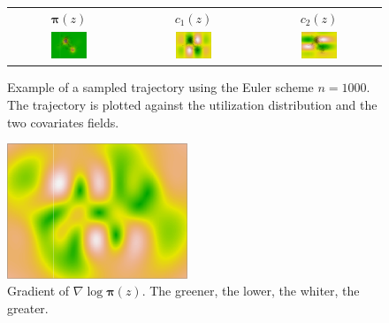 \documentclass[10pt,a4paper]{article}
\newcommand{\ud}{\boldsymbol{\pi}}
\begin{document}
\begin{figure}
\centering
\begin{tabular}{ccc}
$\ud(z)$&$c_1(z)$&$c_2(z)$\\
\includegraphics[width = 0.32\textwidth]{figures/TrajPlusUD}&
\includegraphics[width = 0.32\textwidth]{figures/TrajPlusC1}&
\includegraphics[width = 0.32\textwidth]{figures/TrajPlusC2}
\end{tabular}
\caption{\label{fig:ExampleTrajectory} Example of a sampled trajectory using the Euler scheme $n = 1000$. The trajectory is plotted against the utilization distribution and the two covariates fields.}
\end{figure}
\begin{figure}
\centering
\includegraphics[width = 0.48\textwidth]{figures/GradientNorm}
\caption{\label{fig:GradientNorm} Gradient of $\nabla \log \ud(z)$. The greener, the lower, the whiter, the greater.}
\end{figure}
\end{document}
